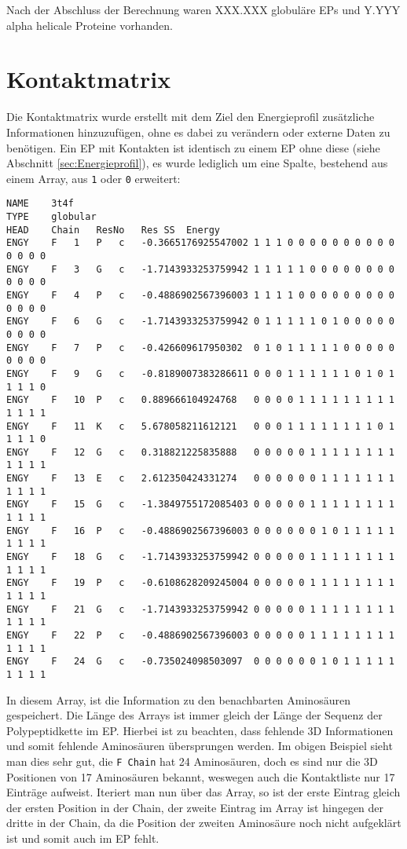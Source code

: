 Nach der Abschluss der Berechnung waren XXX.XXX globuläre \ac{EPs} und Y.YYY alpha helicale Proteine vorhanden.

\section{Kontaktmatrix}
\label{sec:Kontaktmatrix}
Die Kontaktmatrix wurde erstellt mit dem Ziel den Energieprofil zusätzliche Informationen hinzuzufügen, ohne es dabei zu verändern oder externe Daten zu benötigen. Ein \ac{EP} mit Kontakten ist identisch zu einem \ac{EP} ohne diese (siehe Abschnitt \ref{sec:Energieprofil}), es wurde lediglich um eine Spalte, bestehend aus einem Array, aus \texttt{1} oder \texttt{0} erweitert:

\begin{lstlisting}
NAME	3t4f
TYPE	globular
HEAD	Chain	ResNo	Res	SS	Energy
ENGY	F	1	P	c	-0.3665176925547002	1 1 1 0 0 0 0 0 0 0 0 0 0 0 0 0 0
ENGY	F	3	G	c	-1.7143933253759942	1 1 1 1 1 0 0 0 0 0 0 0 0 0 0 0 0
ENGY	F	4	P	c	-0.4886902567396003	1 1 1 1 0 0 0 0 0 0 0 0 0 0 0 0 0
ENGY	F	6	G	c	-1.7143933253759942	0 1 1 1 1 1 0 1 0 0 0 0 0 0 0 0 0
ENGY	F	7	P	c	-0.426609617950302	0 1 0 1 1 1 1 1 0 0 0 0 0 0 0 0 0
ENGY	F	9	G	c	-0.8189007383286611	0 0 0 1 1 1 1 1 1 0 1 0 1 1 1 1 0
ENGY	F	10	P	c	0.889666104924768	0 0 0 0 1 1 1 1 1 1 1 1 1 1 1 1 1
ENGY	F	11	K	c	5.678058211612121	0 0 0 1 1 1 1 1 1 1 1 0 1 1 1 1 0
ENGY	F	12	G	c	0.318821225835888	0 0 0 0 0 1 1 1 1 1 1 1 1 1 1 1 1
ENGY	F	13	E	c	2.612350424331274	0 0 0 0 0 0 1 1 1 1 1 1 1 1 1 1 1
ENGY	F	15	G	c	-1.3849755172085403	0 0 0 0 0 1 1 1 1 1 1 1 1 1 1 1 1
ENGY	F	16	P	c	-0.4886902567396003	0 0 0 0 0 0 1 0 1 1 1 1 1 1 1 1 1
ENGY	F	18	G	c	-1.7143933253759942	0 0 0 0 0 1 1 1 1 1 1 1 1 1 1 1 1
ENGY	F	19	P	c	-0.6108628209245004	0 0 0 0 0 1 1 1 1 1 1 1 1 1 1 1 1
ENGY	F	21	G	c	-1.7143933253759942	0 0 0 0 0 1 1 1 1 1 1 1 1 1 1 1 1
ENGY	F	22	P	c	-0.4886902567396003	0 0 0 0 0 1 1 1 1 1 1 1 1 1 1 1 1
ENGY	F	24	G	c	-0.735024098503097	0 0 0 0 0 0 1 0 1 1 1 1 1 1 1 1 1
\end{lstlisting}

In diesem Array, ist die Information zu den benachbarten Aminosäuren gespeichert. Die Länge des Arrays ist immer gleich der Länge der Sequenz der Polypeptidkette im EP. Hierbei ist zu beachten, dass fehlende 3D Informationen und somit fehlende Aminosäuren übersprungen werden. Im obigen Beispiel sieht man dies sehr gut, die \texttt{F Chain} hat 24 Aminosäuren, doch es sind nur die 3D Positionen von 17 Aminosäuren bekannt, weswegen auch die Kontaktliste nur 17 Einträge aufweist. Iteriert man nun über das Array, so ist der erste Eintrag gleich der ersten Position in der Chain, der zweite Eintrag im Array ist hingegen der dritte in der Chain, da die Position der zweiten Aminosäure noch nicht aufgeklärt ist und somit auch im \ac{EP} fehlt.

